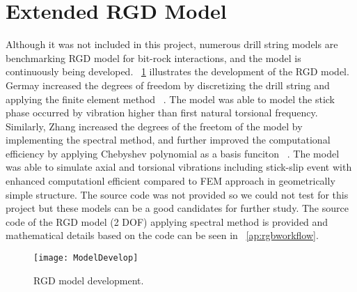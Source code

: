 \section{Extended RGD Model}
Although it was not included in this project, numerous drill string models are benchmarking RGD model for bit-rock interactions\needscitation{}, and the model is continuously being developed. \figurename~\ref{model_develop_figure} illustrates the development of the RGD model. Germay increased the degrees of freedom by discretizing the drill string and applying the finite element method ~\cite{ref:germay2009a}. The model was able to model the stick phase occurred by vibration higher than first natural torsional frequency. Similarly, Zhang increased the degrees of the freetom of the model by implementing the spectral method, and further improved the computational efficiency by applying Chebyshev polynomial as a basis funciton ~\cite{ref:zhang2020a}. The model was able to simulate axial and torsional vibrations including stick-slip event with enhanced computationl efficient compared to FEM approach in geometrically simple structure. The source code was not provided so we could not test for this project but these models can be a good candidates for further study. The source code of the RGD model (2 DOF) applying spectral method is provided and mathematical details based on the code can be seen in \appendixname~\ref{ap:rgbworkflow}.

\begin{figure}[ht]
  \centering
  \texttt{[image: ModelDevelop]}
  \caption[RGD model development]{RGD model development.}\label{model_develop_figure}
\end{figure}



